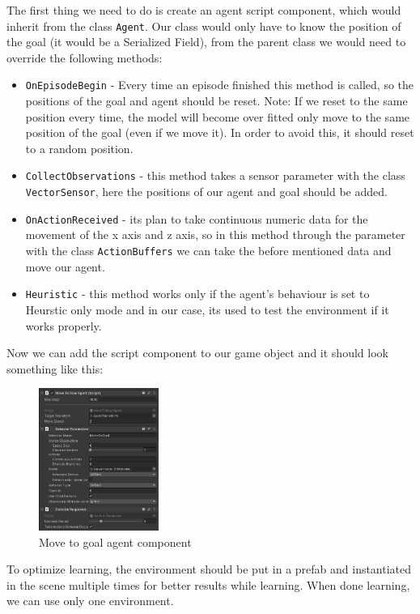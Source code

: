 \documentclass[a4paper, 12pt]{book}
\begin{document}
The first thing we need to do is create an agent script component, which would inherit from the class \texttt{Agent}. Our class would only have to know the position of the goal (it would be a Serialized Field), from the parent class we would need to override the following methods:
\begin{itemize}
    \item \texttt{OnEpisodeBegin} - Every time an episode finished this method is called, so the positions of the goal and agent should be reset. Note: If we reset to the same position every time, the model will become over fitted only move to the same position of the goal (even if we move it). In order to avoid this, it should reset to a random position.
    \item \texttt{CollectObservations} - this method takes a sensor parameter with the class \texttt{VectorSensor}, here the positions of our agent and goal should be added.
    \item \texttt{OnActionReceived} - its plan to take continuous numeric data for the movement of the x axis and z axis, so in this method through the parameter with the class \texttt{ActionBuffers} we can take the before mentioned data and move our agent.
    \item \texttt{Heuristic} - this method works only if the agent's behaviour is set to Heurstic only mode and in our case, its used to test the environment if it works properly.
\end{itemize}

Now we can add the script component to our game object and it should look something like this:
\begin{figure}[h]
\begin{center}
\includegraphics[width=0.35\textwidth]{Images/movetogoalcomponent.png}
\end{center}
\caption{Move to goal agent component}
\label{pic9}
\end{figure}

To optimize learning, the environment should be put in a prefab and instantiated in the scene multiple times for better results while learning. When done learning, we can use only one environment.
\end{document}
